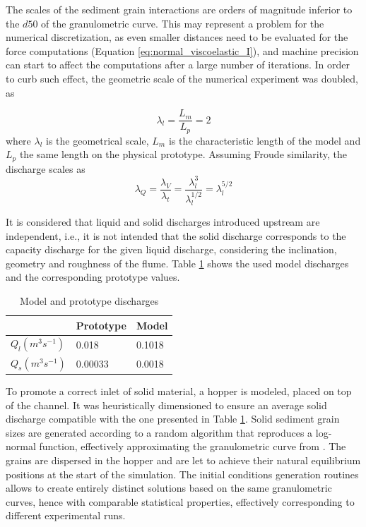 The scales of the sediment grain interactions are orders of magnitude inferior to the $d50$ of the granulometric curve. This may represent a problem for the numerical discretization, as even smaller distances need to be evaluated for the force computations (Equation \eqref{eq:normal_viscoelastic_I}), and machine precision can start to affect the computations after a large number of iterations. In order to curb such effect, the geometric scale of the numerical experiment was doubled, as 

%
\begin{equation} \label{eq:Debris_scale_I}
	\lambda_l=\frac{L_m}{L_p}=2
\end{equation}
%
where $\lambda_l$ is the geometrical scale, $L_m$ is the characteristic length of the model and $L_p$ the same length on the physical prototype. Assuming Froude similarity, the discharge scales as
%
\begin{equation} \label{eq:Debris_scale_II}
	\lambda_Q=\frac{\lambda_V}{\lambda_t}=\frac{\lambda_l^3}{\lambda_l^{1/2}}=\lambda_l^{5/2}
\end{equation}
%

It is considered that liquid and solid discharges introduced upstream are independent, i.e., it is not intended that the solid discharge corresponds to the capacity discharge for the given liquid discharge, considering the inclination, geometry and roughness of the flume. Table \ref{tab:discharges} shows the used model discharges and the corresponding prototype values.

\begin{table}[!ht]
\begin{center}
\begin{tabular}{l|ll} 
 & Prototype & Model \\
\hline
$Q_l (m^3s^{-1})$ & 0.018 & 0.1018 \\
$Q_s (m^3s^{-1})$ & 0.00033 & 0.0018 
\end{tabular}
\end{center}
\caption{Model and prototype discharges}
\label{tab:discharges}
\end{table}

To promote a correct inlet of solid material, a hopper is modeled, placed on top of the channel. It was heuristically dimensioned to ensure an average solid discharge compatible with the one presented in Table \ref{tab:discharges}. 
Solid sediment grain sizes are generated according to a random algorithm that reproduces a log-normal function, effectively approximating the granulometric curve from \cite{Silva-2015}. The grains are dispersed in the hopper and are let to achieve their natural equilibrium positions at the start of the simulation. The initial conditions generation routines allows to create entirely distinct solutions based on the same granulometric curves, hence with comparable statistical properties, effectively corresponding to different experimental runs.

